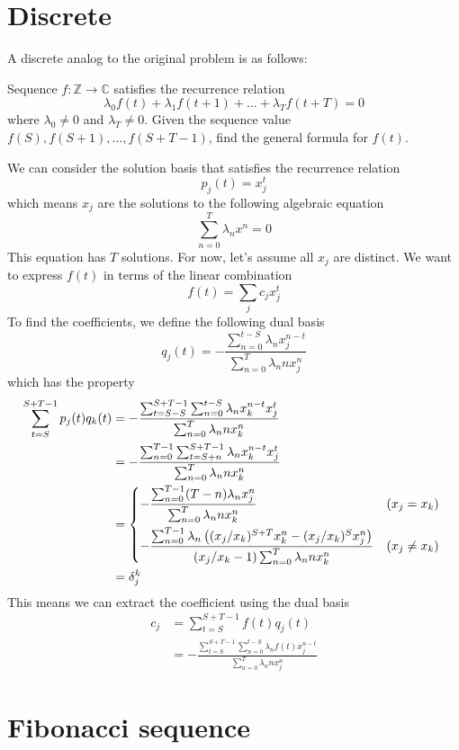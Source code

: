 \documentclass[]{article}
\begin{document}
\section{Discrete}
A discrete analog to the original problem is as follows:

Sequence $f: \mathbb{Z}\to\mathbb{C}$ satisfies the recurrence relation
\[
\lambda_{0} f(t) + \lambda_1 f(t+1) + \dots + \lambda_T f(t+T) = 0
\]
where $\lambda_{0} \ne 0$ and $\lambda_T \ne 0$. Given the sequence value $f(S), f(S+1),\dots,f(S+T-1)$, find the general formula for $f(t)$.

We can consider the solution basis that satisfies the recurrence relation
\[
p_j(t) = x_j^t
\]
which means $x_j$ are the solutions to the following algebraic equation
\[
\sum_{n = 0}^{T} \lambda_{n} x^n = 0 
\]
This equation has $T$ solutions. For now, let's assume all ${x_j}$ are distinct. We want to express $f(t)$ in terms of the linear combination
\[
f(t) = \sum_j c_j x_j^t
\]
To find the coefficients, we define the following dual basis
\[
q_j(t) = -\frac{\sum_{n=0}^{t-S}\lambda_n x_j^{n-t}}{\sum_{n=0}^{T}\lambda_n n x_j^{n}}
\]
which has the property
\begin{align*}
	\sum_{t=S}^{S+T-1} p_j(t) q_k(t) &= -\frac{\sum_{t=S-S}^{S+T-1} \sum_{n=0}^{t-S}\lambda_n x_k^{n-t} x_j^t }{\sum_{n=0}^{T}\lambda_n n x_k^{n}} \\
	&= -\frac{\sum_{n=0}^{T-1}\sum_{t=S+n}^{S+T-1} \lambda_n x_k^{n-t} x_j^t }{\sum_{n=0}^{T}\lambda_n n x_k^{n}} \\
	&= \begin{dcases*} 
		 -\frac{\sum_{n=0}^{T-1}(T-n) \lambda_n x_j^{n} }{\sum_{n=0}^{T}\lambda_n n x_k^{n}} & $(x_j = x_k)$\\
		-\frac{\sum_{n=0}^{T-1}\lambda_n \left((x_j/x_k)^{S+T}x_k^n - (x_j/x_k)^S x_j^n \right)  }{(x_j/x_k - 1)\sum_{n=0}^{T}\lambda_n n x_k^{n}} & $(x_j \ne x_k)$
	\end{dcases*}\\
	&=\delta_{j}^k
\end{align*}
This means we can extract the coefficient using the dual basis
\begin{align*}
	c_j &= 	\sum_{t=S}^{S+T-1} f(t) q_j(t) \\
	&= -\frac{\sum_{t=S}^{S+T-1}\sum_{n=0}^{t-S}\lambda_n f(t) x_j^{n-t}}{\sum_{n=0}^{T}\lambda_n n x_j^{n}}
\end{align*}

\section{Fibonacci sequence}
\end{document}
